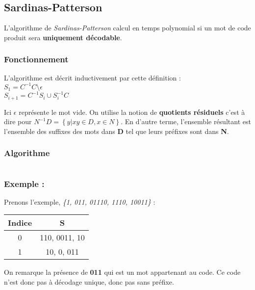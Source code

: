 \subsection{Sardinas-Patterson}

\par L'algorithme de \textit{Sardinas-Patterson} calcul en temps polynomial si un mot de code produit sera \textbf{uniquement décodable}.




\subsubsection{Fonctionnement}
\par L'algorithme est décrit inductivement par cette définition : \\
 $ S_1 = C^{-1}C  \setminus \epsilon$ \\
$S_{i+1} = C^{-1}S_i\cup S_i^{-1}C$
\par Ici $\epsilon$ représente le mot vide. On utilise la notion de \textbf{quotients résiduels} c'est à dire pour $N^{-1}D = \left\{ y | xy \in D, x \in N \right\} $. En d'autre terme, l'ensemble résultant est l'ensemble des suffixes des mots dans \textbf{D} tel que leurs préfixes sont dans \textbf{N}.

\subsubsection{Algorithme}
\begin{verbatim}

\end{verbatim}

\subsubsection{Exemple :}
\par Prenons l'exemple, \textit{\{1, 011, 01110, 1110, 10011\}} : \\ 

\begin{tabular}{|c|c|}
    \hline
    Indice & S \\
    \hline
    0 & 110, 0011, 10\\
    \hline
    1 & 10, 0, 011\\
    \hline
\end{tabular}

\par On remarque la présence de \textbf{011} qui est un mot appartenant au code. Ce code n'est donc pas à décodage unique, donc pas sans préfixe. 
